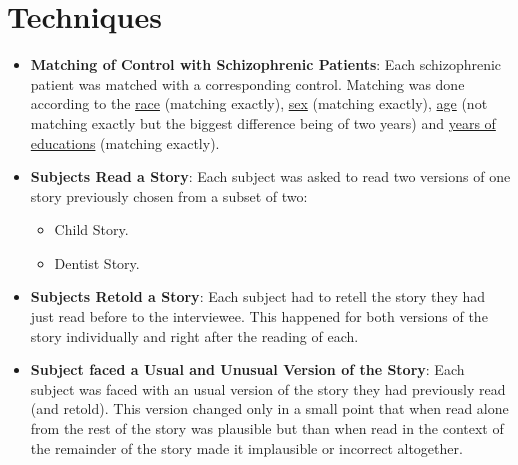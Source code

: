 \documentclass{Paper_Summary}
\begin{document}
\section{Techniques}
    \begin{itemize}
        \item \textbf{Matching of Control with Schizophrenic Patients}: Each schizophrenic patient was matched with a corresponding control. Matching was done according to the \underline{race} (matching exactly), \underline{sex} (matching exactly), \underline{age} (not matching exactly but the biggest difference being of two years) and \underline{years of educations} (matching exactly).
        \item \textbf{Subjects Read a Story}: Each subject was asked to read two versions of one story previously chosen from a subset of two:
            \begin{itemize}
                \item Child Story.
                \item Dentist Story.
            \end{itemize}
        \item \textbf{Subjects Retold a Story}: Each subject had to retell the story they had just read before to the interviewee. This happened for both versions of the story individually and right after the reading of each.
        \item \textbf{Subject faced a Usual and Unusual Version of the Story}: Each subject was faced with an usual version of the story they had previously read (and retold). This version changed only in a small point that when read alone from the rest of the story was plausible but than when read in the context of the remainder of the story made it implausible or incorrect altogether.
    \end{itemize}
\end{document}
